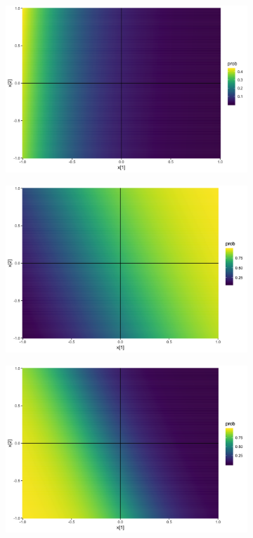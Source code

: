 \documentclass[10pt,mathserif]{beamer}
\begin{document}
\begin{frame}
\begin{figure}
\begin{subfigure}{.17\paperwidth}
    \end{subfigure}
    \begin{subfigure}{.17\paperwidth}
      \centering
      \includegraphics[width=0.17\paperwidth]{figure/sigmoid_plot_6}
    \end{subfigure}
    \begin{subfigure}{.17\paperwidth}
      \centering
      \includegraphics[width=0.17\paperwidth]{figure/sigmoid_plot_7}
    \end{subfigure}
    \begin{subfigure}{.17\paperwidth}
      \centering
      \includegraphics[width=0.17\paperwidth]{figure/sigmoid_plot_8}

\end{subfigure}
\end{figure}
\end{frame}
\end{document}
